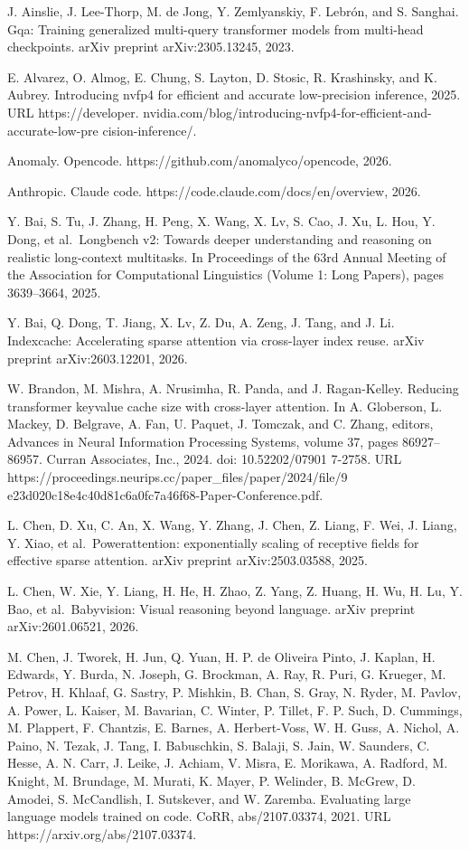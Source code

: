 \documentclass[
  10
]{article}
\begin{document}
J. Ainslie, J. Lee-Thorp, M. de Jong, Y. Zemlyanskiy, F. Lebrón, and S.
Sanghai. Gqa: Training generalized multi-query transformer models from
multi-head checkpoints. arXiv preprint arXiv:2305.13245, 2023.

E. Alvarez, O. Almog, E. Chung, S. Layton, D. Stosic, R. Krashinsky, and
K. Aubrey. Introducing nvfp4 for efficient and accurate low-precision
inference, 2025. URL https://developer.
nvidia.com/blog/introducing-nvfp4-for-efficient-and-accurate-low-pre
cision-inference/.

Anomaly. Opencode. https://github.com/anomalyco/opencode, 2026.

Anthropic. Claude code. https://code.claude.com/docs/en/overview, 2026.

Y. Bai, S. Tu, J. Zhang, H. Peng, X. Wang, X. Lv, S. Cao, J. Xu, L. Hou,
Y. Dong, et al.~Longbench v2: Towards deeper understanding and reasoning
on realistic long-context multitasks. In Proceedings of the 63rd Annual
Meeting of the Association for Computational Linguistics (Volume 1: Long
Papers), pages 3639--3664, 2025.

Y. Bai, Q. Dong, T. Jiang, X. Lv, Z. Du, A. Zeng, J. Tang, and J. Li.
Indexcache: Accelerating sparse attention via cross-layer index reuse.
arXiv preprint arXiv:2603.12201, 2026.

W. Brandon, M. Mishra, A. Nrusimha, R. Panda, and J. Ragan-Kelley.
Reducing transformer keyvalue cache size with cross-layer attention. In
A. Globerson, L. Mackey, D. Belgrave, A. Fan, U. Paquet, J. Tomczak, and
C. Zhang, editors, Advances in Neural Information Processing Systems,
volume 37, pages 86927--86957. Curran Associates, Inc., 2024. doi:
10.52202/07901 7-2758. URL
https://proceedings.neurips.cc/paper\_files/paper/2024/file/9
e23d020c18e4c40d81c6a0fc7a46f68-Paper-Conference.pdf.

L. Chen, D. Xu, C. An, X. Wang, Y. Zhang, J. Chen, Z. Liang, F. Wei, J.
Liang, Y. Xiao, et al.~Powerattention: exponentially scaling of
receptive fields for effective sparse attention. arXiv preprint
arXiv:2503.03588, 2025.

L. Chen, W. Xie, Y. Liang, H. He, H. Zhao, Z. Yang, Z. Huang, H. Wu, H.
Lu, Y. Bao, et al.~Babyvision: Visual reasoning beyond language. arXiv
preprint arXiv:2601.06521, 2026.

M. Chen, J. Tworek, H. Jun, Q. Yuan, H. P. de Oliveira Pinto, J. Kaplan,
H. Edwards, Y. Burda, N. Joseph, G. Brockman, A. Ray, R. Puri, G.
Krueger, M. Petrov, H. Khlaaf, G. Sastry, P. Mishkin, B. Chan, S. Gray,
N. Ryder, M. Pavlov, A. Power, L. Kaiser, M. Bavarian, C. Winter, P.
Tillet, F. P. Such, D. Cummings, M. Plappert, F. Chantzis, E. Barnes, A.
Herbert-Voss, W. H. Guss, A. Nichol, A. Paino, N. Tezak, J. Tang, I.
Babuschkin, S. Balaji, S. Jain, W. Saunders, C. Hesse, A. N. Carr, J.
Leike, J. Achiam, V. Misra, E. Morikawa, A. Radford, M. Knight, M.
Brundage, M. Murati, K. Mayer, P. Welinder, B. McGrew, D. Amodei, S.
McCandlish, I. Sutskever, and W. Zaremba. Evaluating large language
models trained on code. CoRR, abs/2107.03374, 2021. URL
https://arxiv.org/abs/2107.03374.
\end{document}
